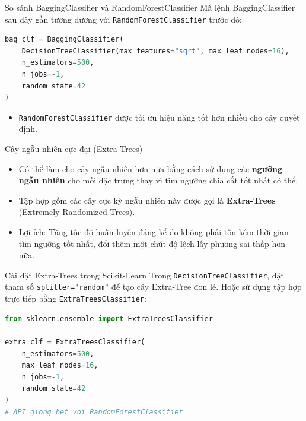 \documentclass[aspectratio=169]{beamer}
\begin{document}
\begin{frame}[fragile]{So sánh BaggingClassifier và RandomForestClassifier}
    Mã lệnh BaggingClassifier sau đây gần tương đương với \texttt{RandomForestClassifier} trước đó:
    \begin{lstlisting}[language=Python]
bag_clf = BaggingClassifier(
    DecisionTreeClassifier(max_features="sqrt", max_leaf_nodes=16),
    n_estimators=500, 
    n_jobs=-1, 
    random_state=42
)
    \end{lstlisting}
    \begin{itemize}
        \item \texttt{RandomForestClassifier} được tối ưu hiệu năng tốt hơn nhiều cho cây quyết định.
    \end{itemize}
\end{frame}

\begin{frame}{Cây ngẫu nhiên cực đại (Extra-Trees)}
    \begin{itemize}
        \item Có thể làm cho cây ngẫu nhiên hơn nữa bằng cách sử dụng các \textbf{ngưỡng ngẫu nhiên} cho mỗi đặc trưng thay vì tìm ngưỡng chia cắt tốt nhất có thể.
        \item Tập hợp gồm các cây cực kỳ ngẫu nhiên này được gọi là \textbf{Extra-Trees} (Extremely Randomized Trees).
        \item Lợi ích: Tăng tốc độ huấn luyện đáng kể do không phải tốn kém thời gian tìm ngưỡng tốt nhất, đổi thêm một chút độ lệch lấy phương sai thấp hơn nữa.
    \end{itemize}
\end{frame}

\begin{frame}[fragile]{Cài đặt Extra-Trees trong Scikit-Learn}
    Trong \texttt{DecisionTreeClassifier}, đặt tham số \texttt{splitter="random"} để tạo cây Extra-Tree đơn lẻ.
    Hoặc sử dụng tập hợp trực tiếp bằng \texttt{ExtraTreesClassifier}:
    \begin{lstlisting}[language=Python]
from sklearn.ensemble import ExtraTreesClassifier

extra_clf = ExtraTreesClassifier(
    n_estimators=500,
    max_leaf_nodes=16,
    n_jobs=-1,
    random_state=42
)
# API giong het voi RandomForestClassifier
    \end{lstlisting}
\end{frame}
\end{document}
